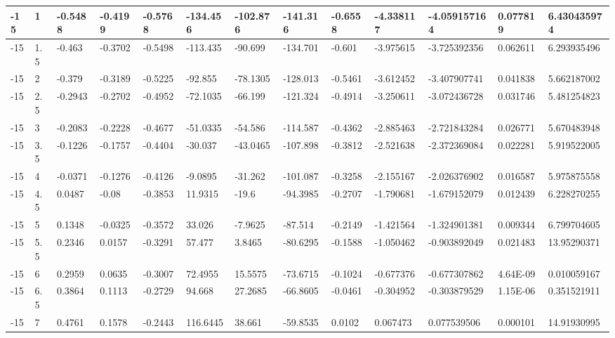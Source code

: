 \begin{longtable}{|l|l|l|l|l|l|l|l|l|l|l|l|l|}
-15   & 1     & -0.5488 & -0.4199 & -0.5768 & -134.456 & -102.876 & -141.316 & -0.6558  & -4.338117   & -4.059157164   & 0.077819                 & 6.430435974 \\ \hline
-15   & 1.5   & -0.463  & -0.3702 & -0.5498 & -113.435 & -90.699  & -134.701 & -0.601   & -3.975615   & -3.725392356   & 0.062611                 & 6.293935496 \\ \hline
-15   & 2     & -0.379  & -0.3189 & -0.5225 & -92.855  & -78.1305 & -128.013 & -0.5461  & -3.612452   & -3.407907741   & 0.041838                 & 5.662187002 \\ \hline
-15   & 2.5   & -0.2943 & -0.2702 & -0.4952 & -72.1035 & -66.199  & -121.324 & -0.4914  & -3.250611   & -3.072436728   & 0.031746                 & 5.481254823 \\ \hline
-15   & 3     & -0.2083 & -0.2228 & -0.4677 & -51.0335 & -54.586  & -114.587 & -0.4362  & -2.885463   & -2.721843284   & 0.026771                 & 5.670483948 \\ \hline
-15   & 3.5   & -0.1226 & -0.1757 & -0.4404 & -30.037  & -43.0465 & -107.898 & -0.3812  & -2.521638   & -2.372369084   & 0.022281                 & 5.919522005 \\ \hline
-15   & 4     & -0.0371 & -0.1276 & -0.4126 & -9.0895  & -31.262  & -101.087 & -0.3258  & -2.155167   & -2.026376902   & 0.016587                 & 5.975875558 \\ \hline
-15   & 4.5   & 0.0487  & -0.08   & -0.3853 & 11.9315  & -19.6    & -94.3985 & -0.2707  & -1.790681   & -1.679152079   & 0.012439                 & 6.228270255 \\ \hline
-15   & 5     & 0.1348  & -0.0325 & -0.3572 & 33.026   & -7.9625  & -87.514  & -0.2149  & -1.421564   & -1.324901381   & 0.009344                 & 6.799704605 \\ \hline
-15   & 5.5   & 0.2346  & 0.0157  & -0.3291 & 57.477   & 3.8465   & -80.6295 & -0.1588  & -1.050462   & -0.903892049   & 0.021483                 & 13.95290371 \\ \hline
-15   & 6     & 0.2959  & 0.0635  & -0.3007 & 72.4955  & 15.5575  & -73.6715 & -0.1024  & -0.677376   & -0.677307862   & 4.64E-09                 & 0.010059167 \\ \hline
-15   & 6.5   & 0.3864  & 0.1113  & -0.2729 & 94.668   & 27.2685  & -66.8605 & -0.0461  & -0.304952   & -0.303879529   & 1.15E-06                 & 0.351521911 \\ \hline
-15   & 7     & 0.4761  & 0.1578  & -0.2443 & 116.6445 & 38.661   & -59.8535 & 0.0102   & 0.067473    & 0.077539506    & 0.000101                 & 14.91930995 \\ \hline

\end{longtable}
